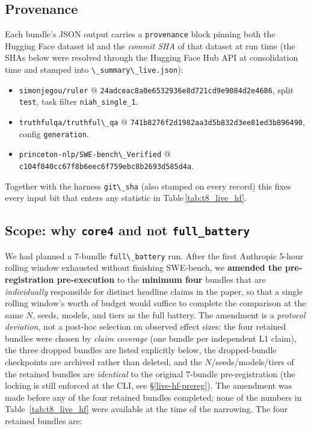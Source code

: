 \subsection{Provenance}\label{live-hf-provenance}

Each bundle's JSON output carries a
\passthrough{\lstinline!provenance!} block pinning both the Hugging Face
dataset id and the \emph{commit SHA} of that dataset at run time (the
SHAs below were resolved through the Hugging Face Hub API at
consolidation time and stamped into
\passthrough{\lstinline!\_summary\_live.json!}):

\begin{itemize}
\tightlist
\item \passthrough{\lstinline!simonjegou/ruler!} @
  \texttt{24adceac8a0e6532936e8d721cd9e9084d2e4686}, split
  \texttt{test}, task filter \texttt{niah\_single\_1}.
\item \passthrough{\lstinline!truthfulqa/truthful\_qa!} @
  \texttt{741b8276f2d1982aa3d5b832d3ee81ed3b896490}, config
  \texttt{generation}.
\item \passthrough{\lstinline!princeton-nlp/SWE-bench\_Verified!} @
  \texttt{c104f840cc67f8b6eec6f759ebc8b2693d585d4a}.
\end{itemize}

Together with the harness \passthrough{\lstinline!git\_sha!} (also
stamped on every record) this fixes every input bit that enters any
statistic in Table\,\ref{tab:t8_live_hf}.

\subsection{Scope: why \texttt{core4} and not
\texttt{full\_battery}}\label{live-hf-scope}

We had planned a 7-bundle \passthrough{\lstinline!full\_battery!} run.
After the first Anthropic 5-hour rolling window exhausted without
finishing SWE-bench, we \textbf{amended the pre-registration
pre-execution} to the \textbf{minimum four} bundles that are
\emph{individually} responsible for distinct headline claims in the
paper, so that a single rolling window's worth of budget would suffice
to complete the comparison at the same $N$, seeds, models, and tiers as
the full battery. The amendment is a \emph{protocol deviation}, not a
post-hoc selection on observed effect sizes: the four retained bundles
were chosen by \emph{claim coverage} (one bundle per independent L1
claim), the three dropped bundles are listed explicitly below, the
dropped-bundle checkpoints are archived rather than deleted, and the
$N$/seeds/models/tiers of the retained bundles are \emph{identical} to
the original 7-bundle pre-registration (the locking is still enforced at
the CLI, see §\ref{live-hf-prereg}). The amendment was made before any
of the four retained bundles completed; none of the numbers in
Table~\ref{tab:t8_live_hf} were available at the time of the narrowing.
The four retained bundles are:

